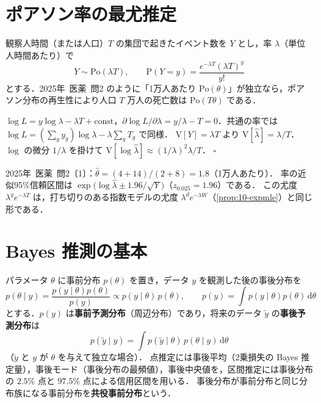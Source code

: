 \documentclass[a4paper,11pt,openany]{ltjsbook}
\newtheorem{meidai}[teigi]{命題}
\newenvironment{proof}[1][証明]{\par\smallskip\noindent{\sffamily\bfseries #1}\quad\ignorespaces}{\nobreak\hfill$\square$\par\medskip}
\newcommand{\tagbox}[2]{\tcbox[on line,boxsep=0.5pt,left=2pt,right=2pt,top=0.5pt,bottom=0.5pt,
  colframe=#1,colback=#1!10,boxrule=0.4pt,arc=1pt]{\scriptsize\bfseries\textcolor{#1}{#2}}}
\newcommand{\Hissu}{\tagbox{bkred}{必須}}
\newcommand{\kakomon}[2]{\mbox{#1年 医薬 問#2}}
\newcommand{\V}{\mathrm{V}}
\newcommand{\Prob}{\mathrm{P}}
\newcommand{\dd}{\mathrm{d}}
\newcommand{\Po}{\mathrm{Po}}
\newcommand{\emphx}[1]{\textbf{\textcolor{bkblue}{#1}}}
\begin{document}
\section{ポアソン率の最尤推定}\label{sec:17-poisson}
観察人時間（または人口）$T$ の集団で起きたイベント数を $Y$ とし，率 $\lambda$（単位人時間あたり）で
\[
Y\sim\Po(\lambda T),\qquad \Prob(Y=y)=\frac{e^{-\lambda T}(\lambda T)^y}{y!}
\]
とする．\kakomon{2025}{2} のように「1万人あたり $\Po(\theta)$」が独立なら，ポアソン分布の再生性により人口 $T$ 万人の死亡数は $\Po(T\theta)$ である．
\begin{proof}
$\log L=y\log\lambda-\lambda T+\text{const}$，$\partial\log L/\partial\lambda=y/\lambda-T=0$．共通の率では $\log L=(\sum_g y_g)\log\lambda-\lambda\sum_g T_g$ で同様．
$\V[Y]=\lambda T$ より $\V[\hat\lambda]=\lambda/T$．$\log$ の微分 $1/\lambda$ を掛けて $\V[\log\hat\lambda]\approx(1/\lambda)^2\lambda/T$．
\end{proof}
\kakomon{2025}{2}〔1〕：$\hat\theta=(4+14)/(2+8)=1.8$（1万人あたり）．
率の近似95\%信頼区間は $\exp\bigl(\log\hat\lambda\pm1.96/\sqrt Y\bigr)$（$z_{0.025}=1.96$）である．
この尤度 $\lambda^ye^{-\lambda T}$ は，打ち切りのある指数モデルの尤度 $\lambda^de^{-\lambda W}$（\cref{prop:10-expmle}）と同じ形である．

\section{Bayes 推測の基本}\label{sec:17-bayes}
\Hissu
パラメータ $\theta$ に事前分布 $p(\theta)$ を置き，データ $y$ を観測した後の事後分布を
\[
p(\theta\mid y)=\frac{p(y\mid\theta)p(\theta)}{p(y)}\propto p(y\mid\theta)\,p(\theta),\qquad p(y)=\int p(y\mid\theta)p(\theta)\,\dd\theta
\]
とする．$p(y)$ は\emphx{事前予測分布}（周辺分布）であり，将来のデータ $\tilde y$ の\emphx{事後予測分布}は
\[
p(\tilde y\mid y)=\int p(\tilde y\mid\theta)\,p(\theta\mid y)\,\dd\theta
\]
（$\tilde y$ と $y$ が $\theta$ を与えて独立な場合）．
点推定には事後平均（2乗損失の Bayes 推定量），事後モード（事後分布の最頻値），事後中央値を，区間推定には事後分布の $2.5\%$ 点と $97.5\%$ 点による信用区間を用いる．
事後分布が事前分布と同じ分布族になる事前分布を\emphx{共役事前分布}という．
\end{document}

